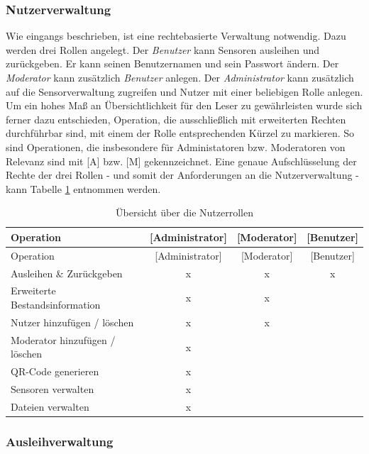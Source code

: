 \documentclass[
]{article}
\begin{document}
\hypertarget{nutzerverwaltung}{%
\subsubsection{Nutzerverwaltung}\label{nutzerverwaltung}}

Wie eingangs beschrieben, ist eine rechtebasierte Verwaltung notwendig. Dazu werden drei Rollen angelegt. Der \emph{Benutzer} kann Sensoren ausleihen und zurückgeben. Er kann seinen Benutzernamen und sein Passwort ändern. Der \emph{Moderator} kann zusätzlich \emph{Benutzer} anlegen. Der \emph{Administrator} kann zusätzlich auf die Sensorverwaltung zugreifen und Nutzer mit einer beliebigen Rolle anlegen. Um ein hohes Maß an Übersichtlichkeit für den Leser zu gewährleisten wurde sich ferner dazu entschieden, Operation, die ausschließlich mit erweiterten Rechten durchführbar sind, mit einem der Rolle entsprechenden Kürzel zu markieren. So sind Operationen, die insbesondere für Administatoren bzw. Moderatoren von Relevanz sind mit {[}A{]} bzw. {[}M{]} gekennzeichnet. Eine genaue Aufschlüsselung der Rechte der drei Rollen - und somit der Anforderungen an die Nutzerverwaltung - kann Tabelle \ref{tab:user-rights} entnommen werden.

\begin{longtable}[]{@{}lccc@{}}
\caption{\label{tab:user-rights} Übersicht über die Nutzerrollen}\tabularnewline
\toprule
Operation & {[}Administrator{]} & {[}Moderator{]} & {[}Benutzer{]} \\
\midrule
\endfirsthead
\toprule
Operation & {[}Administrator{]} & {[}Moderator{]} & {[}Benutzer{]} \\
\midrule
\endhead
Ausleihen \& Zurückgeben & x & x & x \\
Erweiterte Bestandsinformation & x & x & \\
Nutzer hinzufügen / löschen & x & x & \\
Moderator hinzufügen / löschen & x & & \\
QR-Code generieren & x & & \\
Sensoren verwalten & x & & \\
Dateien verwalten & x & & \\
\bottomrule
\end{longtable}

\hypertarget{ausleihverwaltung}{%
\subsubsection{Ausleihverwaltung}\label{ausleihverwaltung}}
\end{document}

